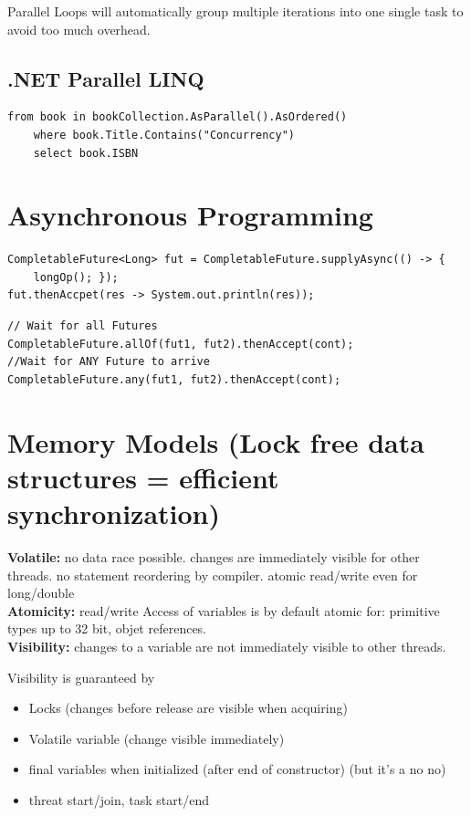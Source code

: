 Parallel Loops will automatically group multiple iterations into one single task to avoid too much overhead.

\subsection{.NET Parallel LINQ}

\begin{lstlisting}[style=java]
  from book in bookCollection.AsParallel().AsOrdered()
    where book.Title.Contains("Concurrency")
    select book.ISBN
\end{lstlisting}

\section{Asynchronous Programming}

\begin{lstlisting}[style=Java]
CompletableFuture<Long> fut = CompletableFuture.supplyAsync(() -> {
	longOp(); });
fut.thenAccpet(res -> System.out.println(res));
\end{lstlisting}
\vspace{1mm}
\begin{lstlisting}[style=Java]
// Wait for all Futures
CompletableFuture.allOf(fut1, fut2).thenAccept(cont);
//Wait for ANY Future to arrive
CompletableFuture.any(fut1, fut2).thenAccept(cont);
\end{lstlisting}

\section{Memory Models (Lock free data structures = efficient synchronization)}
\textbf{Volatile:} no data race possible. changes are immediately visible for other threads. no statement reordering by compiler. atomic read/write even for long/double \\
\textbf{Atomicity:} read/write Access of variables is by default atomic for: primitive types up to 32 bit, objet references. \\
\textbf{Visibility:} changes to a variable are not immediately visible to other threads.

Visibility is guaranteed by
\begin{itemize}
	\item Locks (changes before release are visible when acquiring)
	\item Volatile variable (change visible immediately)
	\item final variables when initialized (after end of constructor) (but it's a no no)
	\item threat start/join, task start/end
\end{itemize}

